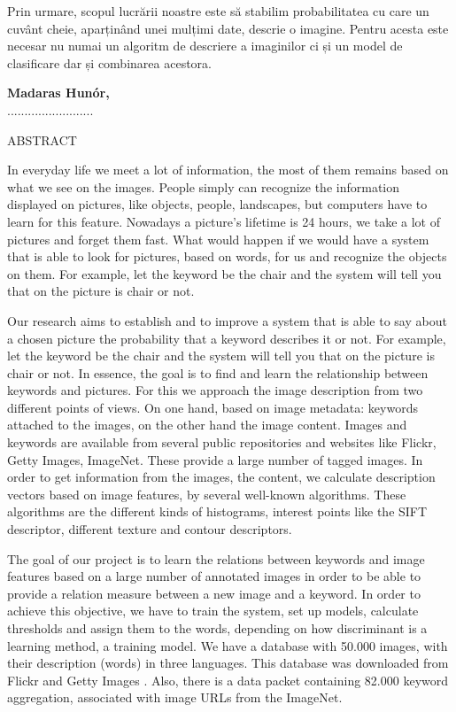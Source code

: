 \documentclass[12pt, a4paper, oneside]{book}
\theoremstyle{tetel}
\begin{document}
	Prin urmare, scopul lucrării noastre este să stabilim probabilitatea cu care un cuvânt cheie, aparținând unei mulțimi date, descrie o imagine. Pentru acesta este necesar nu numai un algoritm de descriere a imaginilor ci și un model de clasificare dar și combinarea acestora.

\begin{flushright}
\textbf{Madaras Hunór,}\\
.........................
\end{flushright}

\newpage
\thispagestyle{empty}
\begin{center}
    \Large ABSTRACT
\end{center}

	In everyday life we meet a lot of information, the most of them remains based on what we see on the images. People simply can recognize the information displayed on pictures, like objects, people, landscapes, but computers have to learn for this feature. Nowadays a picture's lifetime is 24 hours, we take a lot of pictures and forget them fast. What would happen if we would have a system that is able to look for pictures, based on words, for us and recognize the objects on them. For example, let the keyword be the chair and the system will tell you that on the picture is chair or not.

	Our research aims to establish and to improve a system that is able to say about a chosen picture the probability that a keyword describes it or not. For example, let the keyword be the chair and the system will tell you that on the picture is chair or not. In essence, the goal is to find and learn the relationship between keywords and pictures. For this we approach the image description from two different points of views. On one hand, based on image metadata: keywords attached to the images, on the other hand the image content. Images and keywords are available from several public repositories and websites like Flickr\cite{1}, Getty Images\cite{2}, ImageNet\cite{3}. These provide a large number of tagged images. In order to get information from the images, the content, we calculate description vectors based on image features, by several well-known algorithms. These algorithms are the different kinds of histograms, interest points like the SIFT descriptor, different texture and contour descriptors.

	The goal of our project is to learn the relations between keywords and image features based on a large number of annotated images in order to be able to provide a relation measure between a new image and a keyword. In order to achieve this objective, we have to train the system, set up models, calculate thresholds and assign them to the words, depending on how discriminant is a learning method, a training model. We have a database with 50.000 images, with their description (words) in three languages. This database was downloaded from Flickr \cite{1} and Getty Images \cite{2}. Also, there is a data packet containing 82.000 keyword aggregation, associated with image URLs from the ImageNet\cite{3}.
\end{document}
